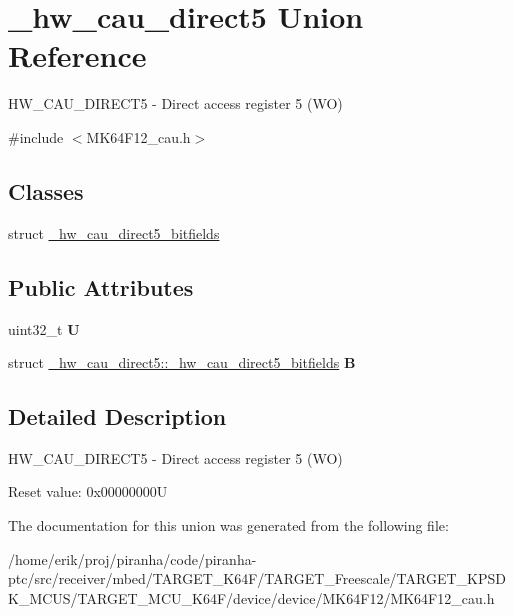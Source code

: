 \hypertarget{union__hw__cau__direct5}{}\section{\+\_\+hw\+\_\+cau\+\_\+direct5 Union Reference}
\label{union__hw__cau__direct5}


H\+W\+\_\+\+C\+A\+U\+\_\+\+D\+I\+R\+E\+C\+T5 -\/ Direct access register 5 (WO)  




{\ttfamily \#include $<$M\+K64\+F12\+\_\+cau.\+h$>$}

\subsection*{Classes}
\begin{DoxyCompactItemize}
\item 
struct \hyperlink{struct__hw__cau__direct5_1_1__hw__cau__direct5__bitfields}{\+\_\+hw\+\_\+cau\+\_\+direct5\+\_\+bitfields}
\end{DoxyCompactItemize}
\subsection*{Public Attributes}
\begin{DoxyCompactItemize}
\item 
uint32\+\_\+t {\bfseries U}\hypertarget{union__hw__cau__direct5_aa46387081af7367d838a816e56fc5bd7}{}\label{union__hw__cau__direct5_aa46387081af7367d838a816e56fc5bd7}

\item 
struct \hyperlink{struct__hw__cau__direct5_1_1__hw__cau__direct5__bitfields}{\+\_\+hw\+\_\+cau\+\_\+direct5\+::\+\_\+hw\+\_\+cau\+\_\+direct5\+\_\+bitfields} {\bfseries B}\hypertarget{union__hw__cau__direct5_ad51a84b3677ba39407ee916d8c0e7bbe}{}\label{union__hw__cau__direct5_ad51a84b3677ba39407ee916d8c0e7bbe}

\end{DoxyCompactItemize}


\subsection{Detailed Description}
H\+W\+\_\+\+C\+A\+U\+\_\+\+D\+I\+R\+E\+C\+T5 -\/ Direct access register 5 (WO) 

Reset value\+: 0x00000000U 

The documentation for this union was generated from the following file\+:\begin{DoxyCompactItemize}
\item 
/home/erik/proj/piranha/code/piranha-\/ptc/src/receiver/mbed/\+T\+A\+R\+G\+E\+T\+\_\+\+K64\+F/\+T\+A\+R\+G\+E\+T\+\_\+\+Freescale/\+T\+A\+R\+G\+E\+T\+\_\+\+K\+P\+S\+D\+K\+\_\+\+M\+C\+U\+S/\+T\+A\+R\+G\+E\+T\+\_\+\+M\+C\+U\+\_\+\+K64\+F/device/device/\+M\+K64\+F12/M\+K64\+F12\+\_\+cau.\+h\end{DoxyCompactItemize}
